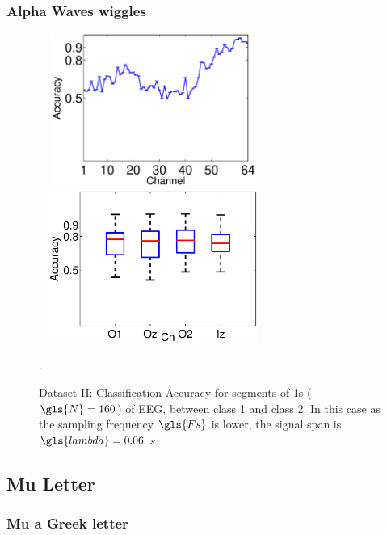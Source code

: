 \documentclass[aspectratio=169]{beamer}
\begin{document}
\begin{frame}
\frametitle{Alpha Waves wiggles}
\begin{figure}[h!]
\centering
\includegraphics[width=7.5cm, height=5cm]{images/DatasetPhysionetAccuracyPerChannel}
\includegraphics[width=7.5cm, height=5cm]{images/DatasetPhysionetBoxPlots}
\caption[PhysioNet Dataset Binary Classification Accuracy]{Dataset II: Classification Accuracy for segments of 1s ($\gls{N} = 160$) of EEG, between class 1 and class 2.  In this case as the sampling frequency $\gls{Fs}$ is lower, the signal span is $\gls{lambda} = 0.06$   $\si{s}$}.
\label{fig:alpharesultsdatasetii}
\end{figure}
\end{frame}





\subsection{Mu Letter}
\begin{frame}
\frametitle{Mu a Greek letter}


\end{frame}
\end{document}
